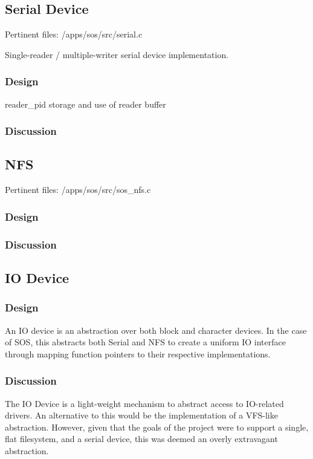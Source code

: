 \documentclass[a4paper,12pt]{article}
\begin{document}
\subsection{Serial Device}
Pertinent files: /apps/sos/src/serial.c

Single-reader / multiple-writer serial device implementation.

\subsubsection{Design}
reader\_pid
storage and use of reader buffer

\subsubsection{Discussion}


\subsection{NFS}
Pertinent files: /apps/sos/src/sos\_nfs.c

\subsubsection{Design}

\subsubsection{Discussion}

\subsection{IO Device}
\subsubsection{Design}
An IO device is an abstraction over both block and character devices.  In the
case of SOS, this abstracts both Serial and NFS to create a uniform IO
interface through mapping function pointers to their respective
implementations.

\subsubsection{Discussion}
The IO Device is a light-weight mechanism to abstract access to IO-related
drivers.  An alternative to this would be the implementation of a VFS-like
abstraction.  However, given that the goals of the project were to support a
single, flat filesystem, and a serial device, this was deemed an overly
extravagant abstraction.
\end{document}
